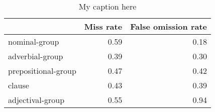 \begin{table}[!ht]
\centering
\begin{tabular}{lrr}
\toprule
{} &  Miss rate &  False omission rate \\
\midrule
nominal-group       &       0.59 &                 0.18 \\
adverbial-group     &       0.39 &                 0.30 \\
prepositional-group &       0.47 &                 0.42 \\
clause              &       0.43 &                 0.39 \\
adjectival-group    &       0.55 &                 0.94 \\
\bottomrule
\end{tabular}
\caption{My caption here}
\label{tab:unit-types-exact-errors}
\end{table}
